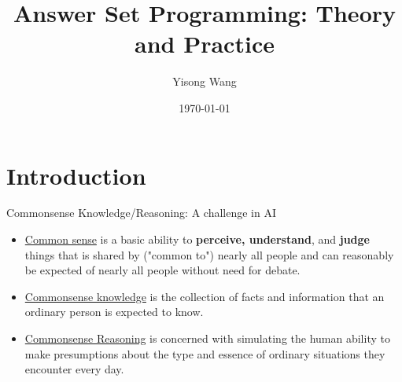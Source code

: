 \title{Answer Set Programming: Theory and Practice}

\author{Yisong Wang}


\date{\today}%


\frame{\titlepage}
\frame{\tableofcontents}

\section{Introduction}
\begin{frame}{Commonsense Knowledge/Reasoning: A challenge in AI}
  \begin{itemize}
    \item \underline{Common sense} is a basic ability to \textbf{perceive, understand}, and \textbf{judge} things that is shared by ("common to") nearly all people and can reasonably be expected of nearly all people without need for debate.

    \item \underline{Commonsense knowledge} is the collection of facts and information that an ordinary person is expected to know.

    \item \underline{Commonsense Reasoning} is concerned with simulating the human ability to make presumptions about the type and essence of ordinary situations they encounter every day.
  \end{itemize}
\end{frame}

